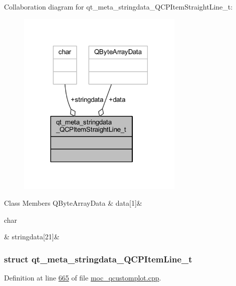 Collaboration diagram for qt\+\_\+meta\+\_\+stringdata\+\_\+\+Q\+C\+P\+Item\+Straight\+Line\+\_\+t\+:
\nopagebreak
\begin{figure}[H]
\begin{center}
\leavevmode
\includegraphics[width=225pt]{d7/d3f/a00173}
\end{center}
\end{figure}
\begin{DoxyFields}{Class Members}
\hypertarget{a00016_a86cfd75cdbd69fb7bac81f44368368a2}{Q\+Byte\+Array\+Data}\label{a00016_a86cfd75cdbd69fb7bac81f44368368a2}
&
data\mbox{[}1\mbox{]}&
\\
\hline

\hypertarget{a00016_a4fcd4918ec3f5999a6ee9ce08ebcdb96}{char}\label{a00016_a4fcd4918ec3f5999a6ee9ce08ebcdb96}
&
stringdata\mbox{[}21\mbox{]}&
\\
\hline

\end{DoxyFields}
\label{d1/dd6/a00108}
\hypertarget{a00016_d1/dd6/a00108}{}
\subsubsection{struct qt\+\_\+meta\+\_\+stringdata\+\_\+\+Q\+C\+P\+Item\+Line\+\_\+t}


Definition at line \hyperlink{a00016_source_l00665}{665} of file \hyperlink{a00016_source}{moc\+\_\+qcustomplot.\+cpp}.



